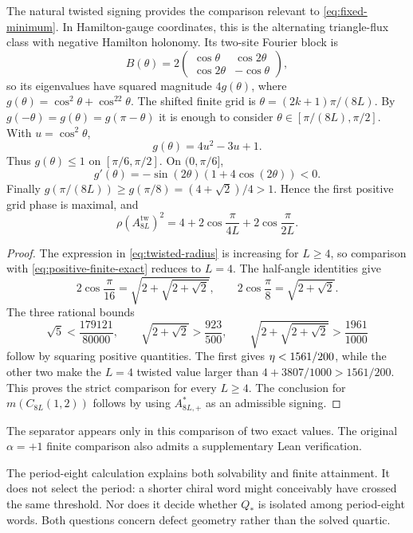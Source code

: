The natural twisted signing provides the comparison relevant to
\eqref{eq:fixed-minimum}.  In
Hamilton-gauge coordinates, this is the alternating triangle-flux class with
negative Hamilton holonomy.  Its two-site Fourier block is
\begin{equation}
 B(\theta)=2\begin{pmatrix}
 \cos\theta&\cos2\theta\\
 \cos2\theta&-\cos\theta
 \end{pmatrix},
 \label{eq:twisted-block}
\end{equation}
so its eigenvalues have squared magnitude $4g(\theta)$, where
$g(\theta)=\cos^2\theta+\cos^22\theta$.  The shifted finite grid is
$\theta=(2k+1)\pi/(8L)$.  By
$g(-\theta)=g(\theta)=g(\pi-\theta)$ it is enough to consider
$\theta\in[\pi/(8L),\pi/2]$.  With $u=\cos^2\theta$,
\[
 g(\theta)=4u^2-3u+1.
\]
Thus $g(\theta)\leq1$ on $[\pi/6,\pi/2]$.  On $(0,\pi/6]$,
\[
 g'(\theta)=-\sin(2\theta)(1+4\cos(2\theta))<0.
\]
Finally $g(\pi/(8L))\geq g(\pi/8)=(4+\sqrt2)/4>1$.  Hence the first positive grid
phase is maximal, and
\begin{equation}
 \rho(A_{8L}^{\mathrm{tw}})^2
 =4+2\cos\frac{\pi}{4L}+2\cos\frac{\pi}{2L}.
 \label{eq:twisted-radius}
\end{equation}

\begin{proof}
The expression in \eqref{eq:twisted-radius} is increasing for $L\geq4$, so
comparison with \eqref{eq:positive-finite-exact} reduces to $L=4$.  The
half-angle identities give
\begin{equation}
 2\cos\frac{\pi}{16}=\sqrt{2+\sqrt{2+\sqrt2}},
 \qquad 2\cos\frac{\pi}{8}=\sqrt{2+\sqrt2}.
 \label{eq:rational-separator}
\end{equation}
The three rational bounds
\[
 \sqrt5<\frac{179121}{80000},\qquad
 \sqrt{2+\sqrt2}>\frac{923}{500},
 \qquad
 \sqrt{2+\sqrt{2+\sqrt2}}>\frac{1961}{1000}
\]
follow by squaring positive quantities.  The first gives
$\eta<1561/200$, while the other two make the $L=4$ twisted value larger
than $4+3807/1000>1561/200$.  This proves the strict comparison for every
$L\geq4$.  The conclusion for $m(C_{8L}(1,2))$ follows by using
$A_{8L,+}^{*}$ as an admissible signing.
\end{proof}

The separator appears only in this comparison of two exact values.  The
original $\alpha=+1$ finite comparison also admits a supplementary Lean
verification.

The period-eight calculation explains both solvability and finite attainment.
It does not select the period: a shorter chiral word might conceivably have
crossed the same threshold.  Nor does it decide whether $Q_*$ is isolated
among period-eight words.  Both questions concern defect geometry rather than
the solved quartic.
